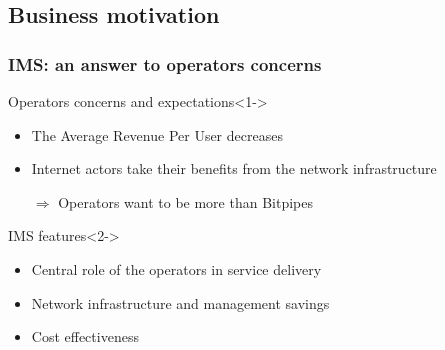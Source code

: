 \documentclass[pdf]{beamer}
\begin{document}
    \subsection{Business motivation}
    \begin{frame}
        \frametitle{IMS: an answer to operators concerns}
     \begin{block}{Operators concerns and expectations}<1->           
            \begin{itemize}
                \item The Average Revenue Per User decreases
                \item Internet actors take their benefits from the network infrastructure
                \item[$\Rightarrow$] Operators want to be more than Bitpipes
            \end{itemize}
        \end{block}
     \begin{block}{IMS features}<2->               
            \begin{itemize}
                \item Central role of the operators in service delivery
                \item Network infrastructure and management savings
                \item Cost effectiveness
            \end{itemize}
        \end{block}
    \end{frame}
   
\end{document}
